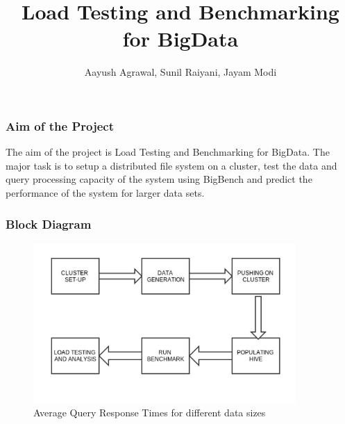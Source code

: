 \documentclass[12pt,xcolor=dvipsnames]{beamer}
\title{Load Testing and Benchmarking for BigData}
\author{Aayush Agrawal, Sunil Raiyani, Jayam Modi}
\begin{document}
 


\begin{frame}
\titlepage
\end{frame}




\begin{frame}[t]
\frametitle{Aim of the Project}
The aim of the project is Load Testing and Benchmarking for BigData. 
\newline
\newline
The major task is to setup a distributed file system on a cluster, test the data and query processing capacity 
of the system using BigBench and predict the performance of the system for larger data sets.
\end{frame}










\begin{frame}[t]
\frametitle{Block Diagram}
\begin{figure}[h]
 \includegraphics[width=10cm]{block_diagram.jpeg}
\caption{Average Query Response Times for different data sizes \label{block}}
\end{figure}
\end{frame}
\end{document}
